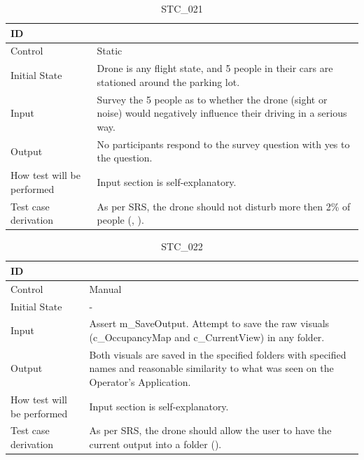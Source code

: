 \documentclass[12pt, titlepage]{article}
\begin{document}
\begin{table}[!h]
\begin{center}
\caption {STC\_021}
\label{tab:STC_021}
\begin{tabular}{ | m{3.2cm} | m{12.2cm} | } 
\hline
ID & \nameref{tab:STC_021} \\ 
\hline
Control & Static \\ 
\hline
Initial State & Drone is any flight state, and 5 people in their cars are stationed around the parking lot. \\ 
\hline
Input & Survey the 5 people as to whether the drone (sight or noise) would negatively influence their driving in a serious way. \\ 
\hline
Output &  No participants respond to the survey question with yes to the question. \\ 
\hline
How test will be performed & Input section is self-explanatory. \\ 
\hline
Test case derivation & As per SRS, the drone should not disturb more then 2\% of people (\nameref{SAFE_004}, \nameref{SAFE_001}).
 \\ 
\hline
\end{tabular}
\end{center}
\end{table}

\begin{table}[!h]
\begin{center}
\caption {STC\_022}
\label{tab:STC_022}
\begin{tabular}{ | m{3.2cm} | m{12.2cm} | } 
\hline
ID & \nameref{tab:STC_022} \\ 
\hline
Control & Manual \\ 
\hline
Initial State & - \\ 
\hline
Input & Assert m_SaveOutput. Attempt to save the raw visuals (c_OccupancyMap and c_CurrentView) in any folder.
 \\ 
\hline
Output &  Both visuals are saved in the specified folders with specified names and reasonable similarity to what was seen on the Operator's Application. \\ 
\hline
How test will be performed & Input section is self-explanatory. \\ 
\hline
Test case derivation & As per SRS, the drone should allow the user to have the current output into a folder (\nameref{USE_002}).
 \\ 
\hline
\end{tabular}
\end{center}
\end{table}
\end{document}
